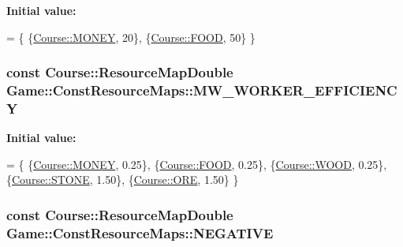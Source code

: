 {\bfseries Initial value\-:}
\begin{DoxyCode}
= \{
    \{\hyperlink{namespaceCourse_a02d49c04029594d4adba79b84bb85f65aff016add6bbbdbb44abf1d2d7f215ec0}{Course::MONEY}, 20\},
    \{\hyperlink{namespaceCourse_a02d49c04029594d4adba79b84bb85f65a7018c47af38bfc1390a89e70b4cf4760}{Course::FOOD}, 50\}
\}
\end{DoxyCode}
\hypertarget{namespaceGame_1_1ConstResourceMaps_a11fc543cda6cf6dbd703559e230eb49a}{
\subsubsection[{M\-W\-\_\-\-W\-O\-R\-K\-E\-R\-\_\-\-E\-F\-F\-I\-C\-I\-E\-N\-C\-Y}]{\setlength{\rightskip}{0pt plus 5cm}const {\bf Course\-::\-Resource\-Map\-Double} Game\-::\-Const\-Resource\-Maps\-::\-M\-W\-\_\-\-W\-O\-R\-K\-E\-R\-\_\-\-E\-F\-F\-I\-C\-I\-E\-N\-C\-Y}}\label{namespaceGame_1_1ConstResourceMaps_a11fc543cda6cf6dbd703559e230eb49a}
{\bfseries Initial value\-:}
\begin{DoxyCode}
= \{
    \{\hyperlink{namespaceCourse_a02d49c04029594d4adba79b84bb85f65aff016add6bbbdbb44abf1d2d7f215ec0}{Course::MONEY}, 0.25\},
    \{\hyperlink{namespaceCourse_a02d49c04029594d4adba79b84bb85f65a7018c47af38bfc1390a89e70b4cf4760}{Course::FOOD}, 0.25\},
    \{\hyperlink{namespaceCourse_a02d49c04029594d4adba79b84bb85f65a87287be3009253b983ffb2e9f91eef22}{Course::WOOD}, 0.25\},
    \{\hyperlink{namespaceCourse_a02d49c04029594d4adba79b84bb85f65a8598c3079c2be7785410e724cc190229}{Course::STONE}, 1.50\},
    \{\hyperlink{namespaceCourse_a02d49c04029594d4adba79b84bb85f65af416a215c7dad21349df38d35be0a1e1}{Course::ORE}, 1.50\}
\}
\end{DoxyCode}
\hypertarget{namespaceGame_1_1ConstResourceMaps_a47a3f289ff3f23e3c884335f8eaa067d}{
\subsubsection[{N\-E\-G\-A\-T\-I\-V\-E}]{\setlength{\rightskip}{0pt plus 5cm}const {\bf Course\-::\-Resource\-Map\-Double} Game\-::\-Const\-Resource\-Maps\-::\-N\-E\-G\-A\-T\-I\-V\-E}}\label{namespaceGame_1_1ConstResourceMaps_a47a3f289ff3f23e3c884335f8eaa067d}
